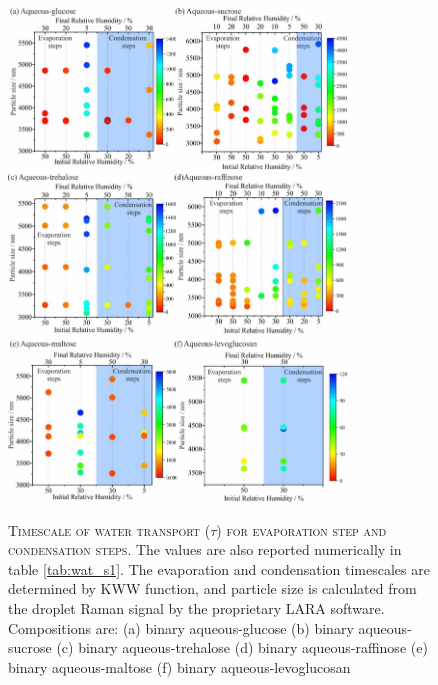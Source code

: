 \begin{figure}
    \centering
    \caption[Timescale of water transport for evaporation step and condensation steps]{\textsc{Timescale of water transport ($\tau$) for evaporation step and condensation steps}. The values are also reported numerically in table \ref{tab:wat_s1}. The evaporation and condensation timescales are determined by KWW function, and particle size is calculated from the droplet Raman signal by the proprietary LARA software. Compositions are: (a) binary aqueous-glucose (b) binary aqueous-sucrose (c) binary aqueous-trehalose (d) binary aqueous-raffinose (e) binary aqueous-maltose (f) binary aqueous-levoglucosan}
    \includegraphics[width=0.8\textwidth]{chapters/water_hopping/figures/image005.jpg}
    \label{fig:wat_s3}
\end{figure}

